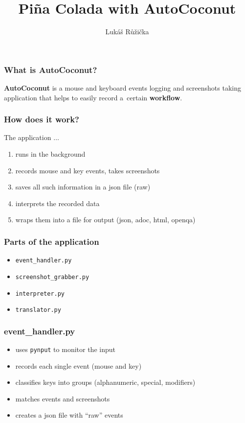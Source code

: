 \documentclass[14pt]{beamer}
\begin{document}
	\author{Lukáš Růžička}
	\title{Pi\~na Colada with AutoCoconut}
	\begin{frame}[plain]
		\maketitle
	\end{frame}
	
	\begin{frame}
		\frametitle{What is AutoCoconut?}
		
		\textbf{AutoCoconut} is a mouse and keyboard events logging and screenshots taking application that helps to easily record a~certain \textbf{workflow}.
	\end{frame} 

\begin{frame}
	\frametitle{How does it work?}
	The application $\ldots$
	\begin{enumerate}
		\item runs in the background
		\item records mouse and key events, takes screenshots
		\item saves all such information in a json file (raw)
		\item interprets the recorded data
		\item wraps them into a file for output (json, adoc, html, openqa)
	\end{enumerate}
\end{frame}

\begin{frame}
	\frametitle{Parts of the application}
	
	\begin{itemize}
		\item \texttt{event\_handler.py}
		\item \texttt{screenshot\_grabber.py}
		\item \texttt{interpreter.py}
		\item \texttt{translator.py}
	\end{itemize}
	
\end{frame}

\begin{frame}
	\frametitle{event\_handler.py}
	\begin{itemize}
	\item uses \texttt{pynput} to monitor the input
 	\item records each single event (mouse and key)
	\item classifies keys into groups (alphanumeric, special, modifiers)
	\item matches events and screenshots
	\item creates a json file with ``raw'' events
	\end{itemize}
\end{frame}

\begin{frame}
	\frametitle{}
\end{frame}

\begin{frame}
	\frametitle{}
\end{frame}
\end{document}
